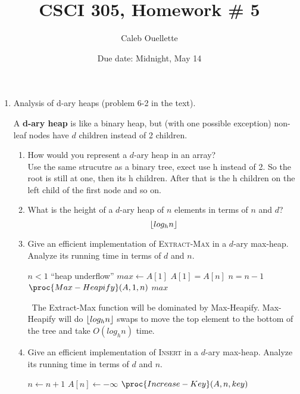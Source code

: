 \documentclass{article}
\title{CSCI 305, Homework \# 5}
\author{Caleb Ouellette}
\date{Due date:  Midnight, May 14}
\DeclarePairedDelimiter\floor{\lfloor}{\rfloor}
\begin{document}
  
  \maketitle
  
  \begin{enumerate}
  \item Analysis of d-ary heaps (problem 6-2 in the text).
  
  A \textbf{d-ary heap} is like a binary heap, but (with one possible
  exception) non-leaf nodes have $d$ children instead of 2 children.
  \begin{enumerate}
  \item How would you represent a $d$-ary heap in an array? \\
    Use the same strucutre as a binary tree, exect use h instead of 2. So the root is still at one, 
    then its h children. After that is the h children on the left child of the first node and so on.
    
  \item What is the height of a $d$-ary heap of $n$ elements in terms
    of $n$ and $d$? \\
    \begin{equation*}
    \floor*{log_h n}
    \end{equation*}

  \item Give an efficient implementation of \textsc{Extract-Max} in
      a $d$-ary max-heap.  Analyze its running time in terms of $d$
    and $n$.
        \begin{codebox}
          \li \If $n < 1$ \Do
          \li \Error ``heap underflow''
        \End
        \li $max \gets A[1]$
        \li $A[1] = A[n]$
        \li $n = n-1$
        \li $\proc{Max-Heapify}(A,1,n)$
        \li \Return $max$
        \end{codebox}
        \ The Extract-Max function will be dominated by Max-Heapify. 
        Max-Heapify will do $\floor*{log_h n}$ swaps to move the top 
        element to the bottom of the tree and take $O(log_h n)$ time.
        
      \item Give an efficient implementation of \textsc{Insert} in
        a $d$-ary max-heap.  Analyze its running time in terms of $d$
        and $n$.

        \begin{codebox}
          \li $n \gets n+1$
          \li $A[n] \gets -\infty$
          \li $\proc{Increase-Key}(A,n,key)$
        \end{codebox}


\end{enumerate}
\end{enumerate}
\end{document}
